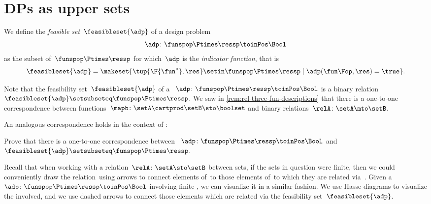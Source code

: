 \section{DPs as upper sets}

\begin{definition}
    \label{def:dp-feasible-set}
    We define the \emph{feasible set}~$\feasibleset{\adp}$ of a design problem
    \begin{equation}
        \label{eq:generic-design-prob}
        \adp\colon \funspop \Ptimes \ressp \toinPos \Bool
    \end{equation}
    as the subset of~$\funspop\Ptimes \ressp$ for which~$\adp$ is the \emph{indicator function}, that is%
    \begin{equation}
        \label{eq:design-prob-as-upper-set}
        \feasibleset{\adp} = \makeset{ \tup{\F{\fun^*},\res} \setin \funspop\Ptimes \ressp  \mid %
            \adp(\fun\Fop, \res) = \true %
        }.
    \end{equation}
\end{definition}

Note that the feasibility set~$\feasibleset{\adp}$ of a ~$\adp \colon \funspop \Ptimes \ressp\toinPos \Bool$ is a binary relation~$\feasibleset{\adp} \setsubseteq \funspop \Ptimes \ressp$.
We saw in \cref{rem:rel-three-fun-descriptions} that there is a one-to-one correspondence between functions~$\mapb \colon \setA \cartprod \setB \sto \boolset$ and binary relations~$\relA\colon \setA \mto \setB$.

An analogous correspondence holds in the context of :

\begin{exercise}
    \label{ex:adp-uppersets}
    Prove that there is a one-to-one correspondence between ~$\adp \colon \funspop \Ptimes \ressp\toinPos \Bool$ and ~$\feasibleset{\adp} \setsubseteq \funspop \Ptimes \ressp$.
\end{exercise}
\begin{solution}
    \missingsolution

\end{solution}

Recall that when working with a relation~$\relA \colon \setA \sto \setB$ between sets, if the sets in question were finite, then we could conveniently draw the relation~\relA using arrows to connect elements of~\setA to those elements of~\setB to which they are related via~\relA.
Given a ~$\adp \colon \funspop \Ptimes \ressp\toinPos \Bool$ involving finite , we can visualize it in a similar fashion.
We use Hasse diagrams to visualize the  involved, and we use dashed arrows to connect those elements which are related via the feasibility set~$\feasibleset{\adp}$.

